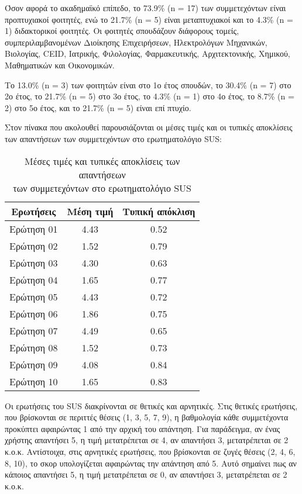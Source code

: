         Όσον αφορά το ακαδημαϊκό επίπεδο, το 73.9\% (n = 17) των συμμετεχόντων είναι προπτυχιακοί φοιτητές, ενώ το 21.7\% (n = 5) είναι μεταπτυχιακοί και το 4.3\% (n = 1) διδακτορικοί φοιτητές. Οι φοιτητές σπουδάζουν διάφορους τομείς, συμπεριλαμβανομένων Διοίκησης Επιχειρήσεων, Ηλεκτρολόγων Μηχανικών, Βιολογίας, CEID, Ιατρικής, Φιλολογίας, Φαρμακευτικής, Αρχιτεκτονικής, Χημικού, Μαθηματικών και Οικονομικών.

        Το 13.0\% (n = 3) των φοιτητών είναι στο 1ο έτος σπουδών, το 30.4\% (n = 7) στο 2ο έτος, το 21.7\% (n = 5) στο 3ο έτος, το 4.3\% (n = 1) στο 4ο έτος, το 8.7\% (n = 2) στο 5ο έτος, και το 21.7\% (n = 5) είναι επί πτυχίο.

        Στον πίνακα που ακολουθεί παρουσιάζονται οι μέσες τιμές και οι τυπικές αποκλίσεις των απαντήσεων των συμμετεχόντων στο ερωτηματολόγιο SUS:
        \begin{table}[H] \noindent\centering \small
            \caption{\centering Μέσες τιμές και τυπικές αποκλίσεις των απαντήσεων \\ των συμμετεχόντων στο ερωτηματολόγιο SUS}
            \begin{tabular}{c|c|c}
               \textbf{Ερωτήσεις} & \textbf{Μέση τιμή} & \textbf{Τυπική απόκλιση} \\
                \midrule
                Ερώτηση 01 & 4.43 & 0.52 \\
                Ερώτηση 02 & 1.52 & 0.79 \\
                Ερώτηση 03 & 4.30 & 0.63 \\
                Ερώτηση 04 & 1.65 & 0.77 \\
                Ερώτηση 05 & 4.43 & 0.72 \\
                Ερώτηση 06 & 1.86 & 0.75 \\
                Ερώτηση 07 & 4.49 & 0.65 \\
                Ερώτηση 08 & 1.52 & 0.73 \\
                Ερώτηση 09 & 4.08 & 0.84 \\
                Ερώτηση 10 & 1.65 & 0.83 \\
            \end{tabular}
            \label{tab:sus-results}
        \end{table}

        Οι ερωτήσεις του SUS διακρίνονται σε θετικές και αρνητικές. Στις θετικές ερωτήσεις, που βρίσκονται σε περιττές θέσεις (1, 3, 5, 7, 9), η βαθμολογία κάθε συμμετέχοντα προκύπτει αφαιρώντας 1 από την αρχική του απάντηση. Για παράδειγμα, αν ένας χρήστης απαντήσει 5, η τιμή μετατρέπεται σε 4, αν απαντήσει 3, μετατρέπεται σε 2 κ.ο.κ. Αντίστοιχα, στις αρνητικές ερωτήσεις, που βρίσκονται σε ζυγές θέσεις (2, 4, 6, 8, 10), το σκορ υπολογίζεται αφαιρώντας την απάντηση από 5. Αυτό σημαίνει πως αν κάποιος απαντήσει 5, η τιμή μετατρέπεται σε 0, αν απαντήσει 3, μετατρέπεται σε 2 κ.ο.κ.

